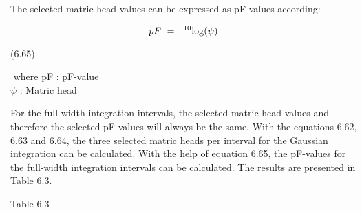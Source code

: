 \documentclass[11pt]{article}
\begin{document}
\bigskip
\bigskip
The selected matric head values can be expressed as pF-values according:

\begin{displaymath}
pF ~=~\ ^{10} {\rm log} (\psi )
\end{displaymath}

 \bigskip
\strut\hfill (6.65)
\nwln
\begin{tabbing}
\hspace{1.27cm}\=\hspace{1.27cm}\=\hspace{1.27cm}\=\hspace{1.27cm}\=%
\hspace{1.27cm}\=\hspace{1.27cm}\=\hspace{1.27cm}\=\hspace{1.27cm}\=%
\hspace{1.27cm}\=\hspace{1.27cm}\=\kill
where\> pF\> : pF-value\> \> \> \> \> \> \> \> [-]\\
\>$\psi$\> : Matric head\> \> \> \> \> \> \> \> [cm]
\end{tabbing}

\bigskip
\bigskip
\bigskip
\bigskip
\bigskip
 For the full-width integration intervals, the selected matric head values and therefore the
selected pF-values will always be the same. With the equations 6.62,  6.63 and 6.64, the
three selected matric heads per interval for the Gaussian integration can be calculated.
With the help of equation 6.65, the pF-values for the full-width integration intervals can
be calculated. The results are presented in Table 6.3.

\bigskip
Table 6.3
\testlastline
\end{document}
